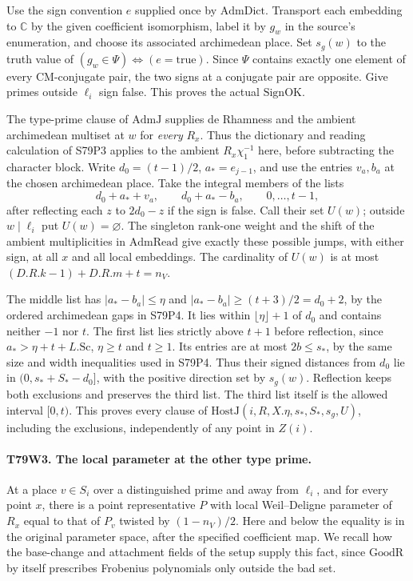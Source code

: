 Use the sign convention $e$ supplied once by $\mathrm{AdmDict}$.
Transport each embedding to $\mathbb C$ by the given coefficient
isomorphism, label it by $g_w$ in the source's enumeration, and
choose its associated archimedean place. Set $s_g(w)$ to the truth
value of $(g_w\in\Psi)\Leftrightarrow(e=\text{true})$.
Since $\Psi$ contains exactly one element of every CM-conjugate pair,
the two signs at a conjugate pair are opposite. Give primes outside
$\ell_i$ sign false. This proves the actual $\mathrm{SignOK}$.

The type-prime clause of $\mathrm{AdmJ}$ supplies de Rhamness and the
ambient archimedean multiset at $w$ for \emph{every} $R_x$.
Thus the dictionary and reading calculation of S79P3 applies to
the ambient $R_x\chi_1^{-1}$ here, before subtracting the character
block. Write $d_0=(t-1)/2$, $a_*=e_{j-1}$, and use the entries
$v_a,b_a$ at the chosen archimedean place. Take the integral members
of the lists
\[
 d_0+a_*+v_a,\qquad d_0+a_*-b_a,\qquad 0,\ldots,t-1,
\]
after reflecting each $z$ to $2d_0-z$ if the sign is false.
Call their set $U(w)$; outside $w\mid\ell_i$ put $U(w)=\varnothing$.
The singleton rank-one weight and the shift of the ambient
multiplicities in $\mathrm{AdmRead}$ give exactly these possible jumps,
with either sign, at all $x$ and all local embeddings.
The cardinality of $U(w)$ is at most $(D.R.k-1)+D.R.m+t=n_V$.

The middle list has $|a_*-b_a|\le\eta$ and
$|a_*-b_a|\ge(t+3)/2=d_0+2$, by the ordered archimedean gaps in
S79P4. It lies within $\lfloor\eta\rfloor+1$ of $d_0$ and
contains neither $-1$ nor $t$. The first list lies strictly above
$t+1$ before reflection, since $a_*>\eta+t+L.\mathrm{Sc}$,
$\eta\ge t$ and $t\ge1$. Its entries are at most $2b\le s_*$,
by the same size and width inequalities used in S79P4. Thus their
signed distances from $d_0$ lie in $(0,s_*+S_*-d_0]$, with
the positive direction set by $s_g(w)$. Reflection keeps both
exclusions and preserves the third list. The third list itself
is the allowed interval $[0,t)$. This proves every clause of
$\mathrm{HostJ}(i,R,X.\eta,s_*,S_*,s_g,U)$, including the
exclusions, independently of any point in $Z(i)$.

\paragraph{T79W3. The local parameter at the other type prime.}
At a place $v\in S_i$ over a distinguished prime and away from
$\ell_i$, and for every point $x$, there is a point representative
$P$ with local Weil--Deligne parameter of $R_x$ equal to that of
$P_v$ twisted by $(1-n_V)/2$. Here and below the equality is in
the original parameter space, after the specified coefficient map.
We recall how the base-change and attachment fields of the setup
supply this fact, since $\mathrm{GoodR}$ by itself prescribes
Frobenius polynomials only outside the bad set.

